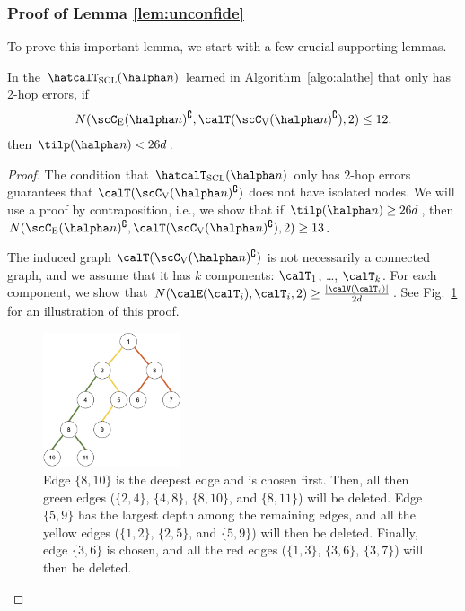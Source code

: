 \documentclass[11pt,onecolumn]{article}
\begin{document}
\subsubsection{Proof of Lemma \ref{lem:unconfide}}
To prove this important lemma, we start with a few crucial supporting lemmas. 
\begin{lemma}\label{lem:tilpbound}
	In the $\hatcalT_{\rm{SCL}}(\halpha n)$ learned in Algorithm~\ref{algo:alathe} that only has 2-hop errors, if 
	\begin{align}
	    N(\scC_{\mathrm{E}}(\halpha n)^{\complement},\calT(\scC_{\mathrm{V}}(\halpha n)^{\complement}),2)\leq 12,
	\end{align}
	then $\tilp(\halpha n)<26d$.
\end{lemma}
\begin{proof}
	The condition that $\hatcalT_{\rm{SCL}}(\halpha n)$ only has $2$-hop errors guarantees that $\calT(\scC_{\mathrm{V}}(\halpha n)^{\complement})$ does not have isolated nodes. We will use a proof by contraposition, i.e., we show that if $\tilp(\halpha n)\geq 26d$, then $N(\scC_{\mathrm{E}}(\halpha n)^{\complement},\calT(\scC_{\mathrm{V}}(\halpha n)^{\complement}),2)\geq 13$.

	The induced graph $\calT(\scC_{\mathrm{V}}(\halpha n)^{\complement})$ is not necessarily a connected graph, and we assume that it has $k$ components: $\calT_{1}$, \ldots, $\calT_{k}$. For each component, we 
	show that $N(\calE(\calT_{i}),\calT_{i},2)\geq \frac{|\calV(\calT_{i})|}{2d}$. See Fig.~\ref{fig:packing} for an illustration of this proof.
	
	\begin{figure}[t] 
		\centering 
		\includegraphics[width=0.36\textwidth]{packing.eps} 
		\caption{Edge $\{8,10\}$ is the deepest edge and is  chosen first. Then, all then green edges ($\{2,4\}$, $\{4,8\}$, $\{8,10\}$, and $\{8,11\}$) will be deleted. Edge $\{5,9\}$ has the largest depth among the remaining edges, and all the yellow edges ($\{1,2\}$, $\{2,5\}$, and $\{5,9\}$) will then be deleted. Finally, edge $\{3,6\}$ is chosen, and all the red edges ($\{1,3\}$, $\{3,6\}$, $\{3,7\}$) will then be deleted.} 
		\label{fig:packing} 
	\end{figure}
	

\end{proof}
\end{document}
